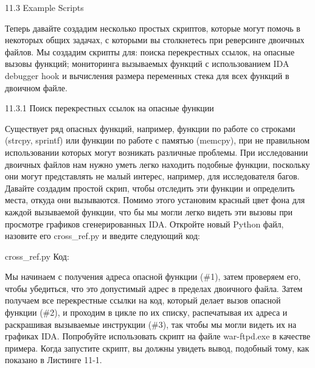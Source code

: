 \documentclass[12pt]{book}
\begin{document}
11.3 Example Scripts

Теперь давайте создадим несколько простых скриптов, которые могут помочь в некоторых общих задачах, с которыми вы столкнетесь при реверсинге двоичных файлов. Мы создадим скрипты для: поиска перекрестных ссылок, на опасные вызовы функций; мониторинга вызываемых функций с использованием IDA debugger hook и вычисления размера переменных стека для всех функций в двоичном файле.

11.3.1 Поиск перекрестных ссылок на опасные функции

Существует ряд опасных функций, например, функции по работе со строками (strcpy, sprintf) или функции по работе с памятью (memcpy), при не правильном использовании которых могут возникать различные проблемы. При исследовании двоичных файлов нам нужно уметь легко находить подобные функции, поскольку они могут представлять не малый интерес, например, для исследователя багов. Давайте создадим простой скрип, чтобы отследить эти функции и определить места, откуда они вызываются. Помимо этого установим красный цвет фона для каждой вызываемой функции, что бы мы могли легко видеть эти вызовы при просмотре графиков сгенерированных IDA. Откройте новый Python файл, назовите его cross\_ref.py и введите следующий код:

cross\_ref.py
Код:







            
Мы начинаем с получения адреса опасной функции (\#1), затем проверяем его, чтобы убедиться, что это допустимый адрес в пределах двоичного файла. Затем получаем все перекрестные ссылки на код, который делает вызов опасной функции (\#2), и проходим в цикле по их списку, распечатывая их адреса и раскрашивая вызываемые инструкции (\#3), так чтобы мы могли видеть их на графиках IDA. Попробуйте использовать скрипт на файле war-ftpd.exe в качестве примера. Когда запустите скрипт, вы должны увидеть вывод, подобный тому, как показано в Листинге 11-1.
\end{document}

